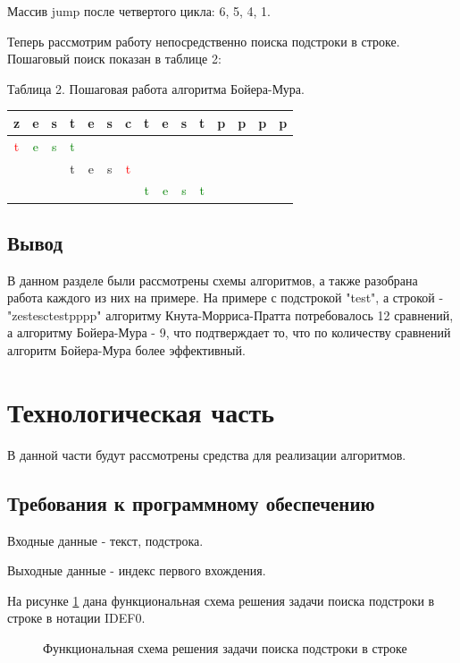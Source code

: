 \documentclass[a4paper, 14pt]{article}
\begin{document}
		Массив jump после четвертого цикла: 6, 5, 4, 1.
		
		Теперь рассмотрим работу непосредственно поиска подстроки в строке. Пошаговый поиск показан в таблице 2:

		\begin{center}
	Таблица 2. Пошаговая работа алгоритма Бойера-Мура.\\

	\begin{tabular}{| c | c | c | c | c | c | c | c | c | c | c | c | c | c | c | }
	\hline
	z&e&s&t&e&s&c&t&e&s&t&p&p&p&p \\
	\hline
	\textcolor{red}{t}&\textcolor{green}{e}&\textcolor{green}{s}&\textcolor{green}{t}&&&&&&&&&&& \\
	&&&t&e&s&\textcolor{red}{t}&&&&&&&& \\
	&&&&&&&\textcolor{green}{t}&\textcolor{green}{e}&\textcolor{green}{s}&\textcolor{green}{t}&&&& \\
	
	\hline

	
	\end{tabular}
		\end{center}
		
\subsection{Вывод}
	В данном разделе были рассмотрены схемы алгоритмов, а также разобрана работа каждого из них на примере. На примере с подстрокой "test", а строкой - "zestesctestpppp" алгоритму Кнута-Морриса-Пратта потребовалось 12 сравнений, а алгоритму Бойера-Мура - 9, что подтверждает то, что по количеству сравнений алгоритм Бойера-Мура более эффективный.
	\newpage
        \section{Технологическая часть}
        В данной части будут рассмотрены средства для реализации алгоритмов.
        \subsection{Требования к программному обеспечению}
        Входные данные - текст, подстрока.
        
        Выходные данные - индекс первого вхождения.
        
        На рисунке \ref{fig:schema_vinograd_optimized} дана функциональная схема решения задачи поиска подстроки в строке в нотации IDEF0.
          \begin{figure}[h]
        	\caption{Функциональная схема решения задачи поиска подстроки в строке}
        	\label{fig:schema_vinograd_optimized}
        \end{figure} \\
\end{document}
